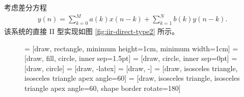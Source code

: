 \begin{definition}
    考虑差分方程
    \begin{align*}
        y(n) = \sum_{k = 0}^{M}a(k)x(n - k) + \sum_{k = 1}^{N}b(k)y(n - k).
    \end{align*}
    该系统的直接 II 型实现如图 \ref{fig:iir-direct-type2} 所示。
    \begin{figure}[H]
        \centering
         = [draw, rectangle, minimum height=1cm, minimum width=1cm]
         = [draw, fill, circle, inner sep=1.5pt]
         = [draw, circle, inner sep=0pt]
         = [draw, circle]
         = [draw, -latex]
         = [draw, -]
         = [draw, isosceles triangle, isosceles triangle apex angle=60]
         = [draw, isosceles triangle, isosceles triangle apex angle=60, shape border rotate=180]
\end{figure}
\end{definition}

